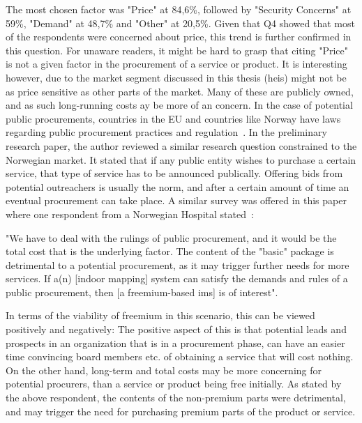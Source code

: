 The most chosen factor was "Price" at 84,6\%, followed by "Security Concerns" at 59\%, "Demand" at 48,7\% and "Other" at 20,5\%. Given that Q4 showed that most of the respondents were concerned about price, this trend is further confirmed in this question. For unaware readers, it might be hard to grasp that citing "Price" is not a given factor in the procurement of a service or product. It is interesting however, due to the market segment discussed in this thesis (\glspl{hei}) might not be as price sensitive as other parts of the market. Many of these are publicly owned, and as such long-running costs ay be more of an concern. In the case of potential public procurements, countries in the EU and countries like Norway have laws regarding public procurement practices and regulation~\cite{europeancommision}\cite{procurement}. In the preliminary research paper, the author reviewed a similar research question constrained to the Norwegian market. It stated that if any public entity wishes to purchase a certain service, that type of service has to be announced publically. Offering bids from potential outreachers is usually the norm, and after a certain amount of time an eventual procurement can take place. A similar survey was offered in this paper where one respondent from a Norwegian Hospital stated~\cite{kristiantagesen2015}:
\begin{displayquote}
"We have to deal with the rulings of public procurement, and it would be the total cost that is the underlying factor. The content of the "basic" package is detrimental to a potential procurement, as it may trigger further needs for more services. If a(n) [indoor mapping] system can satisfy the demands and rules of a public procurement, then [a freemium-based \gls{ims}] is of interest".
\end{displayquote}
In terms of the viability of freemium in this scenario, this can be viewed positively and negatively: The positive aspect of this is that potential leads and prospects in an organization that is in a procurement phase, can have an easier time convincing board members etc. of obtaining a service that will cost nothing. On the other hand, long-term and total costs may be more concerning for potential procurers, than a service or product being free initially. As stated by the above respondent, the contents of the non-premium parts were detrimental, and may trigger the need for purchasing premium parts of the product or service.